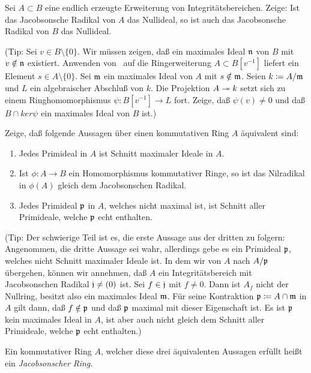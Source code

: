 \begin{exercise}
	\label{exer:trivial_jacobson_ideal}
	Sei \(A \subset B\) eine endlich erzeugte Erweiterung von
	Integritätsbereichen. Zeige: Ist das Jacobsonsche Radikal von \(A\) das
	Nullideal, so ist auch das Jacobsonsche Radikal von \(B\) das Nullideal.
	
	(Tip: Sei \(v \in B \setminus \{0\}\). Wir müssen zeigen, daß ein
	maximales Ideal \(\mathfrak{n}\) von \(B\) mit \(v \notin \mathfrak{n}\) existiert.
	Anwenden von~ auf die Ringerweiterung
	\(A \subset B[v^{-1}]\)
	liefert ein Element \(s \in A \setminus \{0\}\). Sei \(\mathfrak{m}\) ein
	maximales Ideal von \(A\) mit \(s \notin \mathfrak{m}\). Seien \(k \coloneqq
	A/\mathfrak{m}\) und \(L\) ein algebraischer Abschluß von \(k\). Die Projektion
	\(A \twoheadrightarrow k\) setzt sich zu einem Ringhomomorphismus \(\psi\colon B[v^{-1}]
	\to L\) fort. Zeige, daß \(\psi(v) \neq 0\) und daß \(B \cap ker \psi\)
	ein maximales Ideal von \(B\) ist.)
\end{exercise}

\begin{exercise}
	\label{exer:jacobson_ring}
	Zeige, daß folgende Aussagen über einen kommutativen Ring \(A\) äquivalent
	sind:
	\begin{enumerate}
	\item
		Jedes Primideal in \(A\) ist Schnitt maximaler Ideale in \(A\).
	\item
		Ist \(\phi\colon A \to B\) ein Homomorphismus kommutativer Ringe,
		so ist das Nilradikal in \(\phi(A)\) gleich dem Jacobsonschen
		Radikal.
	\item
		Jedes Primideal \(\mathfrak{p}\) in \(A\), welches nicht maximal ist, ist
		Schnitt aller Primideale, welche \(\mathfrak{p}\) echt enthalten.
	\end{enumerate}
	
	(Tip: Der schwierige Teil ist es, die erste Aussage aus der dritten zu
	folgern: Angenommen, die dritte Aussage sei wahr, allerdings gebe es ein
	Primideal \(\mathfrak{p}\), welches nicht Schnitt maximaler Ideale ist.
	In dem wir von \(A\) nach \(A/\mathfrak{p}\) übergehen, können wir annehmen,
	daß \(A\) ein Integritätsbereich mit Jacobsonschen Radikal \(\mathfrak{j}
	\neq (0)\) ist. Sei \(f \in \mathfrak{j}\) mit \(f \neq 0\). Dann ist \(A_f\)
	nicht der Nullring, besitzt also ein maximales Ideal \(\mathfrak{m}\). Für
	seine Kontraktion \(\mathfrak{p} \coloneqq A \cap \mathfrak{m}\) in \(A\) gilt dann,
	daß \(f \notin \mathfrak{p}\) und daß \(\mathfrak{p}\) maximal mit dieser
	Eigenschaft ist. Es ist \(\mathfrak{p}\) kein maximales Ideal in \(A\), ist aber
	auch nicht gleich dem Schnitt aller Primideale, welche \(\mathfrak{p}\) echt
	enthalten.)
	
	Ein kommutativer Ring \(A\), welcher diese drei äquivalenten Aussagen
	erfüllt heißt ein \emph{Jacobsonscher Ring}.
\end{exercise}

